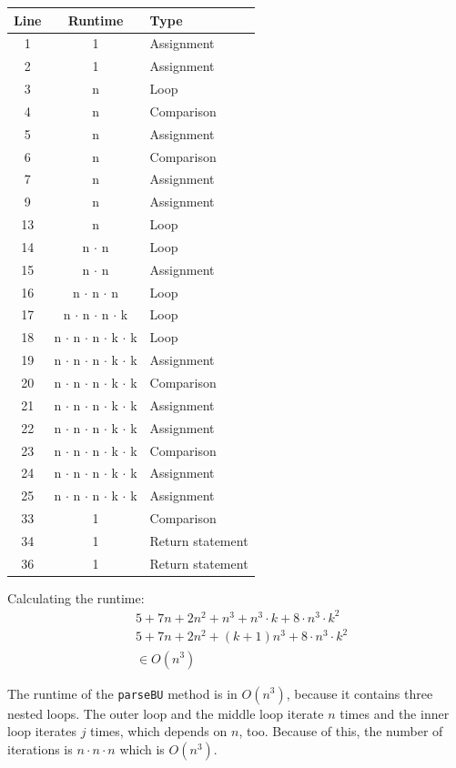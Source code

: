 \documentclass[a4paper, 11pt]{article}
\begin{document}
\begin{minipage}{0.6\textwidth}

\begin{tiny}
\begin{tabular}{|c|c|l|}
\hline
Line & Runtime & Type \\
\hline
1 &  1 & Assignment \\
2 & 1 & Assignment \\
3 & n & Loop \\
4 &  n &  Comparison\\
5 & n  & Assignment\\
6 & n &  Comparison\\
7 & n &  Assignment \\
9 & n & Assignment \\
13 & n & Loop \\
14 & n $\cdot$ n& Loop\\
15  & n $\cdot$ n  & Assignment \\
16 & n $\cdot$ n $\cdot$ n & Loop \\
17  & n $\cdot$ n $\cdot$ n $\cdot$ k & Loop \\
18  & n $\cdot$ n $\cdot$ n $\cdot$ k $\cdot$ k & Loop \\
19 & n $\cdot$ n $\cdot$ n $\cdot$ k $\cdot$ k & Assignment\\
20 & n $\cdot$ n $\cdot$ n $\cdot$ k $\cdot$ k & Comparison\\
21 & n $\cdot$ n $\cdot$ n $\cdot$ k $\cdot$ k & Assignment\\
22& n $\cdot$ n $\cdot$ n $\cdot$ k $\cdot$ k & Assignment\\
23 & n $\cdot$ n $\cdot$ n $\cdot$ k $\cdot$ k & Comparison\\
24  & n $\cdot$ n $\cdot$ n $\cdot$ k $\cdot$ k & Assignment \\
25   & n $\cdot$ n $\cdot$ n $\cdot$ k $\cdot$ k & Assignment\\
33 & 1 & Comparison\\
34 & 1 & Return statement\\
36  & 1 &  Return statement\\
\hline
\end{tabular}
\end{tiny}


\end{minipage}\begin{minipage}{0.4\textwidth}
Calculating the runtime:
\begin{align*}
& 5 + 7n + 2n^2 + n^3 +n^3 \cdot k + 8 \cdot n^3 \cdot k^2 \\
& 5 + 7n + 2n^2 + (k+1)n^3 + 8 \cdot n^3 \cdot k^2 \\
& \in O(n^3)
\end{align*}

\end{minipage}
\newpage
The runtime of the \texttt{parseBU} method is in $O(n^3)$, because it contains three nested loops. The outer loop and the middle loop iterate $n$ times and the inner loop iterates $j$ times, which depends on $n$, too. Because of this, the number of iterations is $n \cdot n \cdot n$ which is $O(n^3)$.
\end{document}
